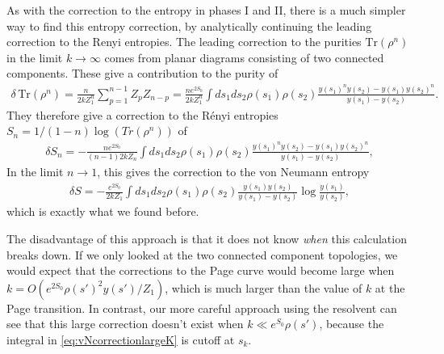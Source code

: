 \documentclass[12pt]{article}
\newcommand{\smax}{s_k}
\newcommand{\sprime}{s'}
\numberwithin{equation}{section}
\def\Tr{\text{Tr}}
\begin{document}
As with the correction to the entropy in phases I and II, there is a much simpler way to find this entropy correction, by analytically continuing the leading correction to the Renyi entropies. The leading correction to the purities $\Tr(\rho^n)$ in the limit $k\to \infty$ comes from planar diagrams consisting of two connected components. These give a contribution to the purity of
\begin{align}
\delta \,\Tr(\rho^n) = \frac{n}{2 k Z_1^n} \sum_{p=1}^{n-1} Z_p Z_{n-p} =  \frac{n e^{2S_0}}{2 k Z_1^n} \int ds_1 ds_2 \rho(s_1) \rho(s_2) \frac{y(s_1)^n y(s_2) - y(s_1) y(s_2)^n}{y(s_1) - y(s_2)}.
\end{align}
They therefore give a correction to the R\'{e}nyi entropies $S_n = 1/(1-n) \log(Tr(\rho^n))$ of
\begin{align}
\delta S_n = - \frac{n  e^{2S_0}}{(n-1) 2 k Z_n}  \int ds_1 ds_2 \rho(s_1) \rho(s_2) \frac{y(s_1)^n y(s_2) - y(s_1) y(s_2)^n}{y(s_1) - y(s_2)},
\end{align}
In the limit $n \to 1$, this gives the correction to the von Neumann entropy
\begin{align}
\delta S = - \frac{ e^{2S_0}}{2 k Z_1}  \int ds_1 ds_2 \rho(s_1) \rho(s_2) \frac{y(s_1)y(s_2)}{y(s_1) - y(s_2)} \log \frac{y(s_1)}{y(s_2)},
\end{align}
which is exactly what we found before.

The disadvantage of this approach is that it does not know \emph{when} this calculation breaks down. If we only looked at the two connected component topologies, we would expect that the corrections to the Page curve would become large when $k =  O(e^{2S_0} \rho(\sprime)^2 y(\sprime)/Z_1)$, which is much larger than the value of $k$ at the Page transition. In contrast, our more careful approach using the resolvent can see that this large correction doesn't exist when $k \ll e^{S_0} \rho(\sprime)$, because the integral in \eqref{eq:vNcorrectionlargeK} is cutoff at $\smax$.
\end{document}

